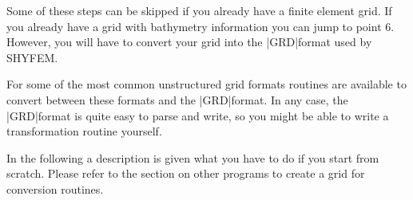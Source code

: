 Some of these steps can be skipped if you already
have a finite element grid. If you already have a grid with bathymetry
information you can jump to point 6. However, you will have to convert
your grid into the |GRD|format used by SHYFEM. 

For some of the most common unstructured grid
formats routines are available to convert between these formats and the
|GRD|format. In any case, the |GRD|format is quite easy to parse and
write, so you might be able to write a transformation routine yourself.

In the following a description is given what you have to do if you start
from scratch. Please refer to the section on other programs to create
a grid for conversion routines.



